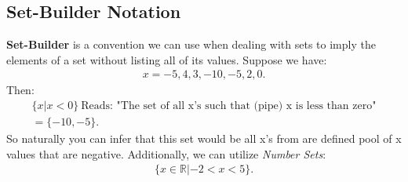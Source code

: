 \documentclass{report}
\begin{document}
    \bigbreak \noindent \bigbreak \noindent 
    \subsection{Set-Builder Notation}
    \bigbreak \noindent 
    \textbf{Set-Builder} is a convention we can use when dealing with sets to imply the elements of a set without listing all of its values.
    \bigbreak \noindent 
    Suppose we have:
    \begin{align*}
        x = -5,4,3,-10,-5,2,0
    .\end{align*}
    \bigbreak \noindent 
    Then:
    \begin{align*}
        \{x | x < 0 \}\ \text{Reads: "The set of all x's such that (pipe) x is less than zero"} \\
        = \{-10,-5\}
    .\end{align*}
    \bigbreak \noindent 
    So naturally you can infer that this set would be all x's from are defined pool of x values that are negative. 
    \bigbreak \noindent 
    Additionally, we can utilize \textit{Number Sets}:
    \begin{align*}
        \{x \in \mathbb{R} | -2 < x < 5\}
    .\end{align*}

    \bigbreak \noindent \bigbreak \noindent 
\end{document}
